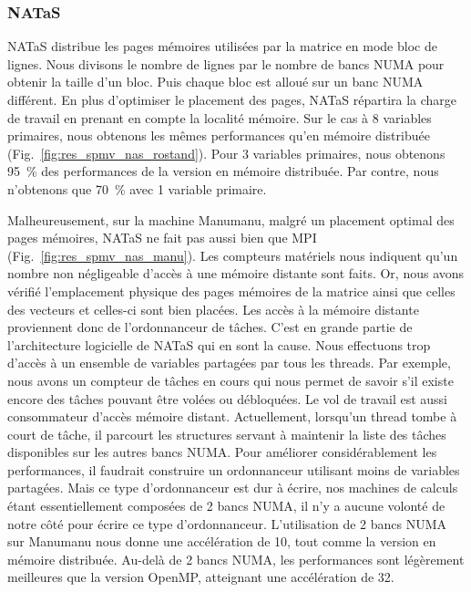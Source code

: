 \subsubsection{NATaS}
NATaS distribue les pages mémoires utilisées par la matrice en mode bloc de lignes.
%
Nous divisons le nombre de lignes par le nombre de bancs NUMA pour obtenir la taille d'un bloc.
%
Puis chaque bloc est alloué sur un banc NUMA différent.
%
En plus d'optimiser le placement des pages, NATaS répartira la charge de travail en prenant en compte la localité mémoire.
%
Sur le cas à 8 variables primaires, nous obtenons les mêmes performances qu'en mémoire distribuée (Fig.~\ref{fig:res_spmv_nas_rostand}).
%
Pour 3 variables primaires, nous obtenons 95~\% des performances de la version en mémoire distribuée.
%
Par contre, nous n'obtenons que 70~\% avec 1 variable primaire.


Malheureusement, sur la machine Manumanu, malgré un placement optimal des pages mémoires, NATaS ne fait pas aussi bien que MPI (Fig.~\ref{fig:res_spmv_nas_manu}).
%
Les compteurs matériels nous indiquent qu'un nombre non négligeable d'accès à une mémoire distante sont faits.
%
Or, nous avons vérifié l'emplacement physique des pages mémoires de la matrice ainsi que celles des vecteurs et celles-ci sont bien placées.
%
Les accès à la mémoire distante proviennent donc de l'ordonnanceur de tâches.
%
C'est en grande partie de l'architecture logicielle de NATaS qui en sont la cause.
%
Nous effectuons trop d'accès à un ensemble de variables partagées par tous les threads.
%
Par exemple, nous avons un compteur de tâches en cours qui nous permet de savoir s'il existe encore des tâches pouvant être volées ou débloquées.
%
Le vol de travail est aussi consommateur d'accès mémoire distant.
%
Actuellement, lorsqu'un thread tombe à court de tâche, il parcourt les structures servant à maintenir la liste des tâches disponibles sur les autres bancs NUMA.
%
Pour améliorer considérablement les performances, il faudrait construire un ordonnanceur utilisant moins de variables partagées.
%
Mais ce type d'ordonnanceur est dur à écrire, nos machines de calculs étant essentiellement composées de 2 bancs NUMA, il n'y a aucune volonté de notre côté pour écrire ce type d'ordonnanceur.
%
L'utilisation de 2 bancs NUMA sur Manumanu nous donne une accélération de 10, tout comme la version en mémoire distribuée.
%
Au-delà de 2 bancs NUMA, les performances sont légèrement meilleures que la version OpenMP, atteignant une accélération de 32.
